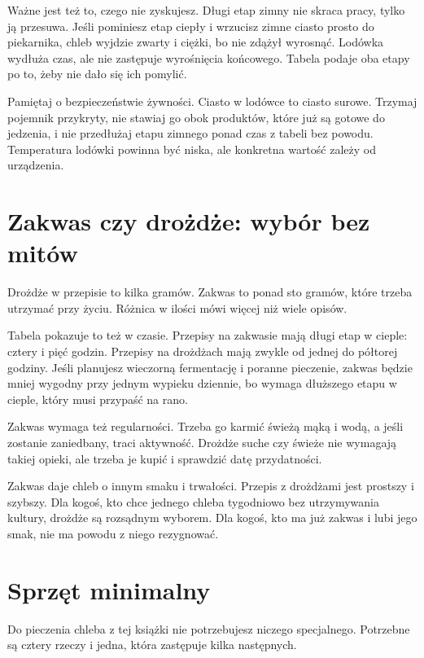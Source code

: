 Ważne jest też to, czego nie zyskujesz. Długi etap zimny nie skraca pracy, tylko ją przesuwa. Jeśli pominiesz etap ciepły i wrzucisz zimne ciasto prosto do piekarnika, chleb wyjdzie zwarty i ciężki, bo nie zdążył wyrosnąć. Lodówka wydłuża czas, ale nie zastępuje wyrośnięcia końcowego. Tabela podaje oba etapy po to, żeby nie dało się ich pomylić.

Pamiętaj o bezpieczeństwie żywności. Ciasto w lodówce to ciasto surowe. Trzymaj pojemnik przykryty, nie stawiaj go obok produktów, które już są gotowe do jedzenia, i nie przedłużaj etapu zimnego ponad czas z tabeli bez powodu. Temperatura lodówki powinna być niska, ale konkretna wartość zależy od urządzenia.

\section{Zakwas czy drożdże: wybór bez mitów}

Drożdże w przepisie to kilka gramów. Zakwas to ponad sto gramów, które trzeba utrzymać przy życiu. Różnica w ilości mówi więcej niż wiele opisów.

Tabela pokazuje to też w czasie. Przepisy na zakwasie mają długi etap w cieple: cztery i pięć godzin. Przepisy na drożdżach mają zwykle od jednej do półtorej godziny. Jeśli planujesz wieczorną fermentację i poranne pieczenie, zakwas będzie mniej wygodny przy jednym wypieku dziennie, bo wymaga dłuższego etapu w cieple, który musi przypaść na rano.

Zakwas wymaga też regularności. Trzeba go karmić świeżą mąką i wodą, a jeśli zostanie zaniedbany, traci aktywność. Drożdże suche czy świeże nie wymagają takiej opieki, ale trzeba je kupić i sprawdzić datę przydatności.

Zakwas daje chleb o innym smaku i trwałości. Przepis z drożdżami jest prostszy i szybszy. Dla kogoś, kto chce jednego chleba tygodniowo bez utrzymywania kultury, drożdże są rozsądnym wyborem. Dla kogoś, kto ma już zakwas i lubi jego smak, nie ma powodu z niego rezygnować.

\section{Sprzęt minimalny}

Do pieczenia chleba z tej książki nie potrzebujesz niczego specjalnego. Potrzebne są cztery rzeczy i jedna, która zastępuje kilka następnych.

